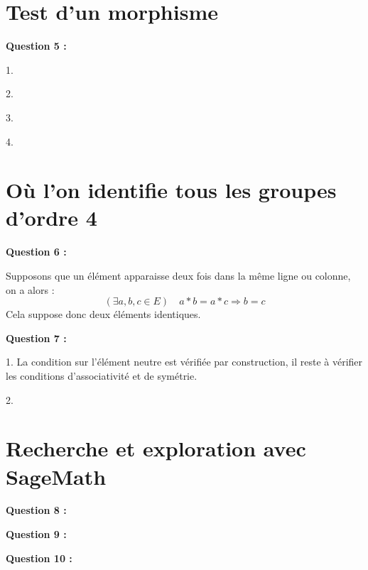 \documentclass[titlepage]{article}
\begin{document}
    \section{Test d'un morphisme}
    \textbf{Question 5 :}

    1.

    2.

    3.

    4.
    \section{Où l’on identifie tous les groupes d’ordre 4}
    \textbf{Question 6 :}

    Supposons que un élément apparaisse deux fois dans la même ligne ou colonne, on a alors :
    \[(\exists a, b, c \in E) \quad a*b=a*c \Longrightarrow b = c\]
    Cela suppose donc deux éléments identiques.

    \textbf{Question 7 :}

    1. La condition sur l'élément neutre est vérifiée par construction, il reste à vérifier les conditions d'associativité et de symétrie.

    2.
    \section{Recherche et exploration avec SageMath}
    \textbf{Question 8 :}

    \textbf{Question 9 :}

    \textbf{Question 10 :}
\end{document}
